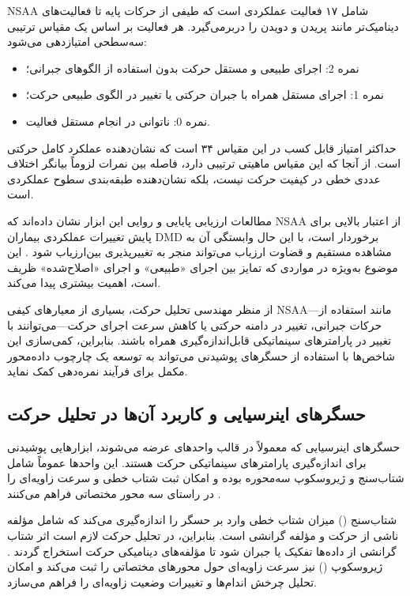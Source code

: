 NSAA شامل ۱۷ فعالیت عملکردی است که طیفی از حرکات پایه تا فعالیت‌های دینامیک‌تر مانند پریدن و دویدن را دربرمی‌گیرد. هر فعالیت بر اساس یک مقیاس ترتیبی سه‌سطحی امتیازدهی می‌شود:

\begin{itemize}
	\item نمره 2: اجرای طبیعی و مستقل حرکت بدون استفاده از الگوهای جبرانی؛
	\item نمره 1: اجرای مستقل همراه با جبران حرکتی یا تغییر در الگوی طبیعی حرکت؛
	\item نمره 0: ناتوانی در انجام مستقل فعالیت.
\end{itemize}

حداکثر امتیاز قابل کسب در این مقیاس ۳۴ است که نشان‌دهنده عملکرد کامل حرکتی است. از آنجا که این مقیاس ماهیتی ترتیبی دارد، فاصله بین نمرات لزوماً بیانگر اختلاف عددی خطی در کیفیت حرکت نیست، بلکه نشان‌دهنده طبقه‌بندی سطوح عملکردی است.

مطالعات ارزیابی پایایی و روایی این ابزار نشان داده‌اند که NSAA از اعتبار بالایی برای پایش تغییرات عملکردی بیماران DMD برخوردار است، با این حال وابستگی آن به مشاهده مستقیم و قضاوت ارزیاب می‌تواند منجر به تغییرپذیری بین‌ارزیاب شود \cite{Mayhew2013Reliability}. این موضوع به‌ویژه در مواردی که تمایز بین اجرای «طبیعی» و اجرای «اصلاح‌شده» ظریف است، اهمیت بیشتری پیدا می‌کند.

از منظر مهندسی تحلیل حرکت، بسیاری از معیارهای کیفی NSAA—مانند استفاده از حرکات جبرانی، تغییر در دامنه حرکتی یا کاهش سرعت اجرای حرکت—می‌توانند با تغییر در پارامترهای سینماتیکی قابل‌اندازه‌گیری همراه باشند. بنابراین، کمی‌سازی این شاخص‌ها با استفاده از حسگرهای پوشیدنی می‌تواند به توسعه یک چارچوب داده‌محور مکمل برای فرآیند نمره‌دهی کمک نماید.

\subsection{حسگرهای اینرسیایی و کاربرد آن‌ها در تحلیل حرکت}

حسگرهای اینرسیایی که معمولاً در قالب واحدهای  عرضه می‌شوند، ابزارهایی پوشیدنی برای اندازه‌گیری پارامترهای سینماتیکی حرکت هستند. این واحدها عموماً شامل شتاب‌سنج و ژیروسکوپ سه‌محوره بوده و امکان ثبت شتاب خطی و سرعت زاویه‌ای را در راستای سه محور مختصاتی فراهم می‌کنند \cite{Sabatini2011IMU}.

شتاب‌سنج () میزان شتاب خطی وارد بر حسگر را اندازه‌گیری می‌کند که شامل مؤلفه ناشی از حرکت و مؤلفه گرانشی است. بنابراین، در تحلیل حرکت لازم است اثر شتاب گرانشی از داده‌ها تفکیک یا جبران شود تا مؤلفه‌های دینامیکی حرکت استخراج گردند \cite{Madgwick2011SensorFusion}. ژیروسکوپ () نیز سرعت زاویه‌ای حول محورهای مختصاتی را ثبت می‌کند و امکان تحلیل چرخش اندام‌ها و تغییرات وضعیت زاویه‌ای را فراهم می‌سازد.

